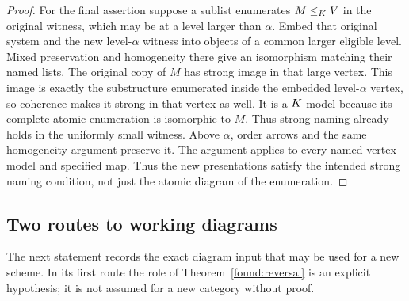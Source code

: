 \begin{proof}
For the final assertion suppose a sublist enumerates
$M\leq_K V$ in the original witness, which may be at a level
larger than $\alpha$.  Embed that original system and the new
level-$\alpha$ witness into objects of a common larger eligible
level.  Mixed preservation and homogeneity there give an
isomorphism matching their named lists.  The original copy of $M$
has strong image in that large vertex.  This image is exactly the
substructure enumerated inside the embedded level-$\alpha$ vertex,
so coherence makes it strong in that vertex as well.  It is a
$K$-model because its complete atomic enumeration is isomorphic
to $M$.  Thus strong naming already holds in the uniformly small
witness.  Above $\alpha$, order arrows and the same homogeneity
argument preserve it.  The argument applies to every named
vertex model and specified map.
Thus the new presentations satisfy the intended strong naming
condition, not just the atomic diagram of the enumeration.
\end{proof}

\subsection{Two routes to working diagrams}

The next statement records the exact diagram input that may be used
for a new scheme.  In its first route the role of
Theorem~\ref{found:reversal} is an explicit hypothesis; it is not
assumed for a new category without proof.

